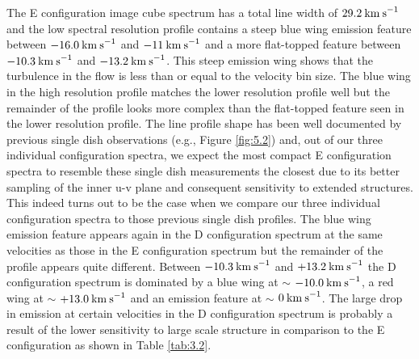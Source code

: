The E configuration image cube spectrum has a total line width of $29.2\>{\rm km\>s}^{-1}$ and the low spectral resolution profile contains a steep blue wing emission feature between $-16.0\>{\rm km\>s}^{-1}$ and $-11\>{\rm km\>s}^{-1}$ and a more flat-topped feature between $-10.3\>{\rm km\>s}^{-1}$ and $-13.2\>{\rm km\>s}^{-1}$. This steep emission wing shows that the turbulence in the flow is less than or equal to the velocity bin size. The blue wing in the high resolution profile matches the lower resolution profile well but the  remainder of the profile looks more complex than the flat-topped feature seen in the lower resolution profile. The line profile shape has been well documented by previous single dish observations (e.g., Figure \ref{fig:5.2}) and, out of our three individual configuration spectra, we expect the most compact E configuration spectra to resemble these single dish measurements the closest due to its better sampling of the inner u-v plane and consequent sensitivity to extended structures. This indeed turns out to be the case when we compare our three individual configuration spectra to those previous single dish profiles. The blue wing emission feature appears again in the D configuration spectrum at the same velocities as those in the E configuration spectrum but the remainder of the profile appears quite different. Between $-10.3\>{\rm km\>s}^{-1}$ and $+13.2\>{\rm km\>s}^{-1}$ the D configuration spectrum is dominated by a blue wing at $\sim$ $-10.0\>{\rm km\>s}^{-1}$, a red wing at $\sim$ $+13.0\>{\rm km\>s}^{-1}$ and an emission feature at $\sim$ $0\>{\rm km\>s}^{-1}$. The large drop in emission at certain velocities in the D configuration spectrum is probably a result of the lower sensitivity to large scale structure in comparison to the E configuration as shown in Table \ref{tab:3.2}.

